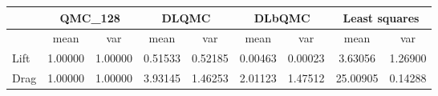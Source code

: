 \begin{tabular}{|l|c|c|c|c|c|c|c|c|}
\hline
 &\multicolumn{2}{c|}{\textbf{QMC\_128}}&\multicolumn{2}{c|}{\textbf{DLQMC}}&\multicolumn{2}{c|}{\textbf{DLbQMC}}&\multicolumn{2}{c|}{\textbf{Least squares}}\\ 
\hline

 &mean&var&mean&var&mean&var&mean&var\\ 
\hline
Lift &1.00000&1.00000&0.51533&0.52185&0.00463&0.00023&3.63056&1.26900\\ 
\hline
Drag &1.00000&1.00000&3.93145&1.46253&2.01123&1.47512&25.00905&0.14288\\ 
\hline
\end{tabular}

